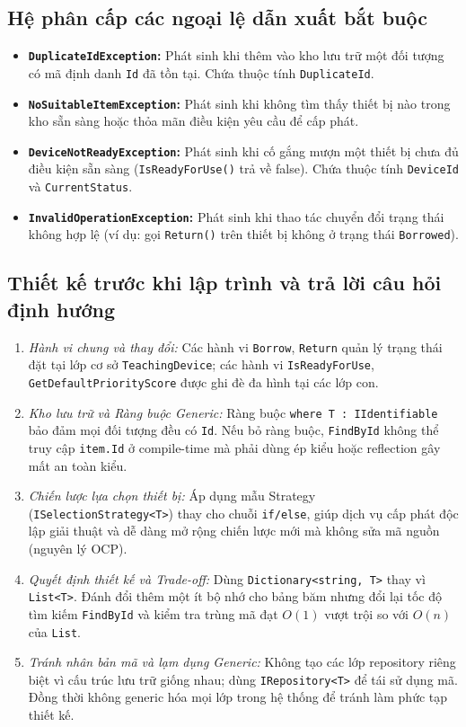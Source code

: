 \documentclass[11pt,a4paper]{article}
\begin{document}
\subsection{Hệ phân cấp các ngoại lệ dẫn xuất bắt buộc}
\begin{itemize}[itemsep=1.2pt]
    \item \textbf{\texttt{DuplicateIdException}:} Phát sinh khi thêm vào kho lưu trữ một đối tượng có mã định danh \texttt{Id} đã tồn tại. Chứa thuộc tính \texttt{DuplicateId}.
    \item \textbf{\texttt{NoSuitableItemException}:} Phát sinh khi không tìm thấy thiết bị nào trong kho sẵn sàng hoặc thỏa mãn điều kiện yêu cầu để cấp phát.
    \item \textbf{\texttt{DeviceNotReadyException}:} Phát sinh khi cố gắng mượn một thiết bị chưa đủ điều kiện sẵn sàng (\texttt{IsReadyForUse()} trả về false). Chứa thuộc tính \texttt{DeviceId} và \texttt{CurrentStatus}.
    \item \textbf{\texttt{InvalidOperationException}:} Phát sinh khi thao tác chuyển đổi trạng thái không hợp lệ (ví dụ: gọi \texttt{Return()} trên thiết bị không ở trạng thái \texttt{Borrowed}).
\end{itemize}

\subsection{Thiết kế trước khi lập trình và trả lời câu hỏi định hướng}
\begin{enumerate}[itemsep=1.0pt]
    \item \textit{Hành vi chung và thay đổi:} Các hành vi \texttt{Borrow}, \texttt{Return} quản lý trạng thái đặt tại lớp cơ sở \texttt{TeachingDevice}; các hành vi \texttt{IsReadyForUse}, \texttt{GetDefaultPriorityScore} được ghi đè đa hình tại các lớp con.
    \item \textit{Kho lưu trữ và Ràng buộc Generic:} Ràng buộc \texttt{where T : IIdentifiable} bảo đảm mọi đối tượng đều có \texttt{Id}. Nếu bỏ ràng buộc, \texttt{FindById} không thể truy cập \texttt{item.Id} ở compile-time mà phải dùng ép kiểu hoặc reflection gây mất an toàn kiểu.
    \item \textit{Chiến lược lựa chọn thiết bị:} Áp dụng mẫu Strategy (\texttt{ISelectionStrategy<T>}) thay cho chuỗi \texttt{if/else}, giúp dịch vụ cấp phát độc lập giải thuật và dễ dàng mở rộng chiến lược mới mà không sửa mã nguồn (nguyên lý OCP).
    \item \textit{Quyết định thiết kế và Trade-off:} Dùng \texttt{Dictionary<string, T>} thay vì \texttt{List<T>}. Đánh đổi thêm một ít bộ nhớ cho bảng băm nhưng đổi lại tốc độ tìm kiếm \texttt{FindById} và kiểm tra trùng mã đạt $O(1)$ vượt trội so với $O(n)$ của \texttt{List}.
    \item \textit{Tránh nhân bản mã và lạm dụng Generic:} Không tạo các lớp repository riêng biệt vì cấu trúc lưu trữ giống nhau; dùng \texttt{IRepository<T>} để tái sử dụng mã. Đồng thời không generic hóa mọi lớp trong hệ thống để tránh làm phức tạp thiết kế.
\end{enumerate}
\end{document}
